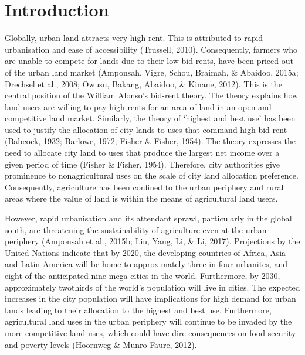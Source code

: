 \chapter{Introduction} %

\label{Chapter:Introduction}

Globally, urban land attracts very high rent. This is attributed to rapid urbanisation and ease of accessibility (Trussell, 2010). Consequently, farmers who are unable to compete for lands due to their low bid rents, have been priced out of the urban land market (Amponsah, Vigre, Schou, Braimah, \& Abaidoo, 2015a; Drechsel et al., 2008; Owusu, Bakang, Abaidoo, \& Kinane, 2012). This is the central position of the William Alonso's bid-rent theory. The theory explains how land users are willing to pay high rents for an area of land in an open and competitive land market. Similarly, the theory of ‘highest and best use’ has been used to justify the allocation of city lands to uses that command high bid rent (Babcock, 1932; Barlowe, 1972; Fisher \& Fisher, 1954). The theory expresses the need to allocate city land to uses that produce the largest net income over a given period of time (Fisher \& Fisher, 1954). Therefore, city authorities give prominence to nonagricultural uses on the scale of city land allocation preference. Consequently, agriculture has been confined to the urban periphery and rural areas where the value of land is within the means of agricultural land users.

However, rapid urbanisation and its attendant sprawl, particularly in the global south, are threatening the sustainability of agriculture even at the urban periphery (Amponsah et al., 2015b; Liu, Yang, Li, \& Li, 2017). Projections by the United Nations indicate that by 2020, the developing countries of Africa, Asia and Latin America will be home to
approximately three in four urbanites, and eight of the anticipated nine
mega-cities in the world. Furthermore, by 2030, approximately twothirds of the world's population will live in cities. The expected increases in the city population will have implications for high demand for urban lands leading to their allocation to the highest and best use. Furthermore, agricultural land uses in the urban periphery will continue to be invaded by the more competitive land uses, which could have dire consequences on food security and poverty levels (Hoornweg \& Munro-Faure, 2012).

